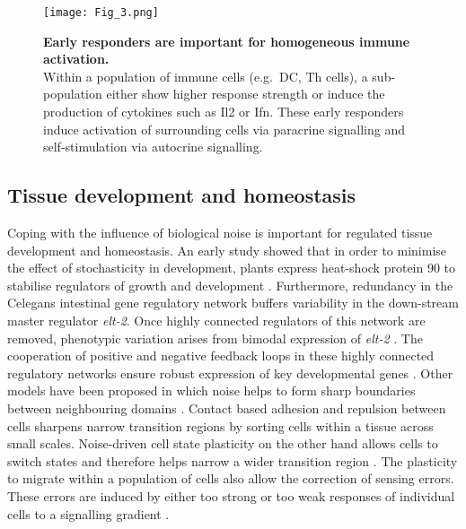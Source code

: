 
\begin{figure}[!h]
\centering
\texttt{[image: Fig\_3.png]}
\caption[Early responders are important for homogeneous immune activation]{\textbf{Early responders are important for homogeneous immune activation.}\\
Within a population of immune cells (e.g.~\gls{DC}, \gls{Th} cells), a sub-population either show higher response strength or induce the production of cytokines such as \gls{Il}2 or \gls{Ifn}\textbeta. 
These early responders induce activation of surrounding cells via paracrine signalling and self-stimulation via autocrine signalling.}
\label{fig0:noise_immune}
\end{figure}

\vspace{-5mm}

\subsection{Tissue development and homeostasis}

Coping with the influence of biological noise is important for regulated tissue development and homeostasis. 
An early study showed that in order to minimise the effect of stochasticity in development, plants express heat-shock protein 90 to stabilise regulators of growth and development \citep{Queitsch2002}. 
Furthermore, redundancy in the \Gls{Celegans} intestinal gene regulatory network buffers variability in the down-stream master regulator \textit{elt-2}. 
Once highly connected regulators of this network are removed, phenotypic variation arises from bimodal expression of \textit{elt-2} \citep{Raj2010}. 
The cooperation of positive and negative feedback loops in these highly connected regulatory networks ensure robust expression of key developmental genes \citep{Ji2013}. 
Other models have been proposed in which noise helps to form sharp boundaries between neighbouring domains \citep{Zhang2012}. 
Contact based adhesion and repulsion between cells sharpens narrow transition regions by sorting cells within a tissue across small scales. 
Noise-driven cell state plasticity on the other hand allows cells to switch states and therefore helps narrow a wider transition region \citep{Wang2017}. 
The plasticity to migrate within a population of cells also allow the correction of sensing errors. 
These errors are induced by either too strong or too weak responses of individual cells to a signalling gradient \citep{Camley2017}.\\

